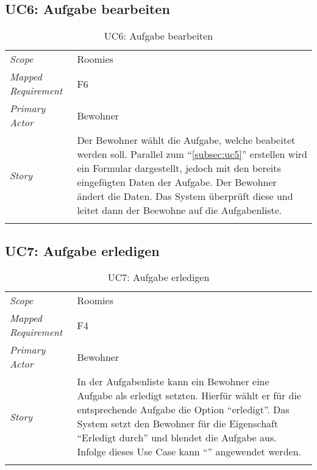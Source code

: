 \subsection{UC6: Aufgabe bearbeiten}\label{subsec:uc6}
\begin{table}[H]
	\tablestyle
	\tablealtcolored
	\begin{tabularx}{\textwidth}{lX}
		\tablebody
			\textit{Scope} &
			Roomies
			\tabularnewline
			\textit{Mapped Requirement} &
			F6
			\tabularnewline
			\textit{Primary Actor} &
			Bewohner
			\tabularnewline
			\textit{Story} &
			Der Bewohner wählt die Aufgabe, welche beabeitet werden soll. Parallel zum ``\ref{subsec:uc5}'' erstellen wird ein Formular dargestellt, jedoch mit den bereits eingefügten Daten der Aufgabe. Der Bewohner ändert die Daten. Das System überprüft diese und leitet dann der Beewohne auf die Aufgabenliste.
			\tabularnewline
		\tableend
	\end{tabularx}
	\caption{UC6: Aufgabe bearbeiten}
\end{table}


\subsection{UC7: Aufgabe erledigen}\label{subsec:uc7}
\begin{table}[H]
	\tablestyle
	\tablealtcolored
	\begin{tabularx}{\textwidth}{lX}
		\tablebody
			\textit{Scope} &
			Roomies
			\tabularnewline
			\textit{Mapped Requirement} &
			F4
			\tabularnewline
			\textit{Primary Actor} &
			Bewohner
			\tabularnewline
			\textit{Story} &
			In der Aufgabenliste kann ein Bewohner eine Aufgabe als erledigt setzten. Hierfür wählt er für die entsprechende Aufgabe die Option ``erledigt''. Das System setzt den Bewohner für die Eigenschaft ``Erledigt durch'' und blendet die Aufgabe aus.
			\newline Infolge dieses Use Case kann ``\nameref{subsec:uc11}'' angewendet werden.
			\tabularnewline
		\tableend
	\end{tabularx}
	\caption{UC7: Aufgabe erledigen}
\end{table}


